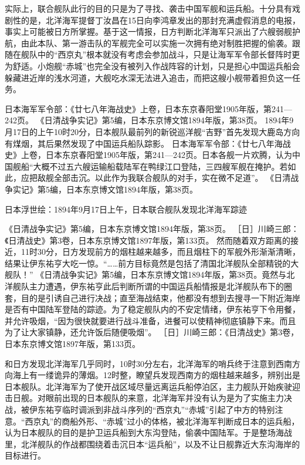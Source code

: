 \documentclass[12pt,UTF8]{ctexbook}
\begin{document}
实际上，联合舰队此行的目的只是为了寻找、袭击中国军舰和运兵船。十分具有戏剧性的是，北洋海军提督丁汝昌在15日向李鸿章发出的那封充满虚假消息的电报，事实上可能被日方所掌握。基于这一情报，日方判断北洋海军只派出了六艘弱舰护航，由此本队、第一游击队的军舰完全可以实施一次拥有绝对制胜把握的偷袭。跟随在舰队中的“西京丸”根本就没有考虑会参加战斗，只是让海军军令部长督阵时更为舒适。小炮舰“赤城”也完全没有被列入作战阵容的计划，只是担心中国运兵船会躲藏进近岸的浅水河道，大舰吃水深无法进入追击，而把这艘小舰带着担负这一任务。

日本海军军令部：《廿七八年海战史》上卷，日本东京春阳堂1905年版，第241—242页。
《日清战争实记》第5编，日本东京博文馆1894年版，第38页。
1894年9月17日的上午10时20分，日本舰队最前列的新锐巡洋舰“吉野”首先发现大鹿岛方向有煤烟，其后果然发现了中国运兵船队踪影。 日本海军军令部：《廿七八年海战史》上卷，日本东京春阳堂1905年版，第241—242页。日本各舰一片欢腾，认为中国舰船“大概不过五六艘运输船载陆军在鸭绿江口登陆，三四艘军舰在掩护。若如此，应把敌舰全部击沉。以此作为我联合舰队的对手，实在微不足道”。 《日清战争实记》第5编，日本东京博文馆1894年版，第38页。


日本浮世绘：1894年9月17日上午，日本联合舰队发现北洋海军踪迹

《日清战争实记》第5编，日本东京博文馆1894年版，第38页。
［日］川崎三郎：《日清战史》第3卷，日本东京博文馆1897年版，第133页。
然而随着双方距离的接近，11时30分，日方发现前方的烟柱越来越多，而且烟柱下的军舰外形渐渐清晰，结果让伊东祐亨大吃一惊。“……前方目标竟然是包括了清国北洋舰队全部精锐的大舰队！” 《日清战争实记》第5编，日本东京博文馆1894年版，第38页。竟然与北洋舰队主力遭遇，伊东祐亨此后判断所谓的中国运兵船情报是北洋舰队布下的圈套，目的是引诱自己进行决战；直至海战结束，他都没有想到去搜寻一下附近海岸是否有中国陆军登陆的踪迹。为了稳定舰队内的不安定情绪，伊东祐亨下令用餐，并允许吸烟，“因为很快就要进行战斗准备，进餐可以使精神彻底镇静下来。而且为了让大家镇静，还允许饭后随便吸烟”。 ［日］川崎三郎：《日清战史》第3卷，日本东京博文馆1897年版，第133页。

和日方发现北洋海军几乎同时，10时30分左右，北洋海军的哨兵终于注意到西南方向海上有一缕诡异的薄烟。12时整，瞭望兵发现西南方的烟柱越来越多，辨别出是日本舰队。北洋海军为了使开战区域尽量远离运兵船停泊区，主力舰队开始疾驶迎击日舰。对眼前出现的日本舰队的来意，北洋海军并没有认为是为了实施主力决战，被伊东祐亨临时调派到非战斗序列的“西京丸”“赤城”引起了中方的特别注意。“西京丸”的商船外形、“赤城”过小的体格，被北洋海军判断成日本的运兵船，认为日本舰队的目的是护卫运兵船到大东沟登陆，偷袭中国陆军。于是整场海战里，北洋舰队的作战都围绕着击沉日本“运兵船”，以及不让日舰靠近大东沟海岸的目标进行。
\end{document}
